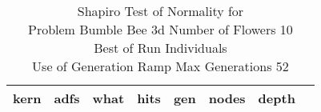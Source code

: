 \begin{table}[H]
\caption{Shapiro Test of Normality for \\ Problem  Bumble Bee 3d  Number of Flowers 10\\Best of Run Individuals \\ Use of Generation Ramp  Max Generations 52\\}
\begin{center}
\scalebox{0.8} %
{
\begin{tabular}{lrrrrrrr}
\hline
kern & adfs & what & hits & gen & nodes & depth \\
\hline


\end{tabular}
}
\end{center}
\end{table}

